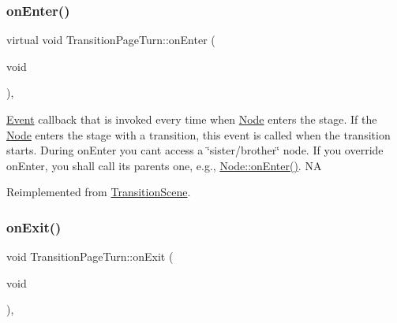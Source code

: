 \mbox{\label{classTransitionPageTurn_adb15cf19b760250156d6fa3f2e1dbf31}} 
\subsubsection{\texorpdfstring{on\+Enter()}{onEnter()}\hspace{0.1cm}{\footnotesize\ttfamily [2/2]}}
{\footnotesize\ttfamily virtual void Transition\+Page\+Turn\+::on\+Enter (\begin{DoxyParamCaption}\item[{void}]{ }\end{DoxyParamCaption})\hspace{0.3cm}{\ttfamily [override]}, {\ttfamily [virtual]}}

\hyperlink{classEvent}{Event} callback that is invoked every time when \hyperlink{classNode}{Node} enters the \textquotesingle{}stage\textquotesingle{}. If the \hyperlink{classNode}{Node} enters the \textquotesingle{}stage\textquotesingle{} with a transition, this event is called when the transition starts. During on\+Enter you can\textquotesingle{}t access a \char`\"{}sister/brother\char`\"{} node. If you override on\+Enter, you shall call its parent\textquotesingle{}s one, e.\+g., \hyperlink{classNode_a7f51764c4afd5018a052b9ef71c03374}{Node\+::on\+Enter()}.  NA 

Reimplemented from \hyperlink{classTransitionScene_aace390a1bd8f3c73bb650a1e256a0f83}{Transition\+Scene}.

\mbox{\label{classTransitionPageTurn_a5c53ecc8cf81db631e7af1c5fa12d942}} 
\subsubsection{\texorpdfstring{on\+Exit()}{onExit()}\hspace{0.1cm}{\footnotesize\ttfamily [1/2]}}
{\footnotesize\ttfamily void Transition\+Page\+Turn\+::on\+Exit (\begin{DoxyParamCaption}\item[{void}]{ }\end{DoxyParamCaption})\hspace{0.3cm}{\ttfamily [override]}, {\ttfamily [virtual]}}

